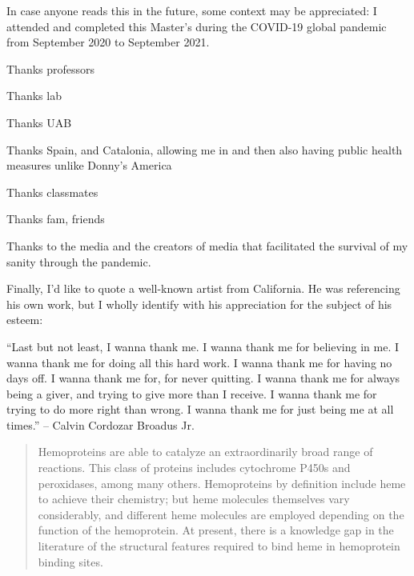 \documentclass[a4paper, nobind]{templates/ociamthesis}
\begin{document}

\begin{romanpages}

\maketitle


\begin{acknowledgements}
 	In case anyone reads this in the future, some context may be appreciated: I attended and completed this Master's during the COVID-19 global pandemic from September 2020 to September 2021.

  Thanks professors

  Thanks lab

  Thanks UAB

  Thanks Spain, and Catalonia, allowing me in and then also having public health measures unlike Donny's America

  Thanks classmates

  Thanks fam, friends

  Thanks to the media and the creators of media that facilitated the survival of my sanity through the pandemic.

  Finally, I'd like to quote a well-known artist from California. He was referencing his own work, but I wholly identify with his appreciation for the subject of his esteem:

  ``Last but not least, I wanna thank me. I wanna thank me for believing in me. I wanna thank me for doing all this hard work. I wanna thank me for having no days off. I wanna thank me for, for never quitting. I wanna thank me for always being a giver, and trying to give more than I receive. I wanna thank me for trying to do more right than wrong. I wanna thank me for just being me at all times.''
  -- Calvin Cordozar Broadus Jr.
\end{acknowledgements}


\begin{abstract}
	Hemoproteins are able to catalyze an extraordinarily broad range of reactions. This class of proteins includes cytochrome P450s and peroxidases, among many others. Hemoproteins by definition include heme to achieve their chemistry; but heme molecules themselves vary considerably, and different heme molecules are employed depending on the function of the hemoprotein. At present, there is a knowledge gap in the literature of the structural features required to bind heme in hemoprotein binding sites.


\end{abstract}
\end{romanpages}
\end{document}
